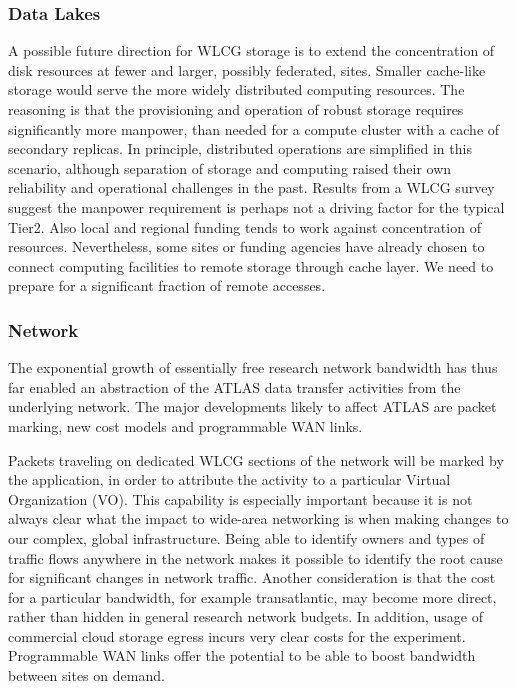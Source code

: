 \subsubsection{Data Lakes}
\label{sec:lakes}
A possible future direction for WLCG storage is to extend the concentration of disk resources at fewer and larger, possibly federated, sites. Smaller cache-like storage would serve the more widely 
distributed computing resources. The reasoning is that the provisioning and operation of robust storage requires significantly more manpower, than needed for a compute cluster with a cache of secondary replicas. In principle, distributed operations are simplified in this scenario, although separation of storage and computing raised their own reliability and operational challenges in the past. Results from a WLCG survey suggest the manpower requirement is perhaps not a driving factor for the typical Tier2. Also local and regional funding tends to work against concentration of resources. Nevertheless, some sites or funding agencies have already chosen to connect computing facilities to remote storage through cache layer. We need to prepare for a significant fraction of remote accesses.

\subsubsection{Network}
\label{sec:network} 
The exponential growth of essentially free research network bandwidth has thus far enabled an abstraction of the ATLAS data transfer activities from the underlying network. The major developments likely to affect ATLAS are packet marking, new cost models and programmable WAN links.  

Packets traveling on dedicated WLCG sections of the network will be marked by the application, in order to attribute the activity to a particular Virtual Organization (VO). This capability is especially important because it is not always clear what the impact to wide-area networking is when making changes to our complex, global infrastructure. Being able to identify owners and types of traffic flows anywhere in the network makes it possible to identify the root cause for significant changes in network traffic.  Another consideration is that the cost for a particular bandwidth, for example transatlantic, may become more direct, rather than hidden in general research network budgets. In addition, usage of commercial cloud storage egress incurs very clear costs for the experiment.  Programmable WAN links offer the potential to be able to boost bandwidth between sites on demand.


